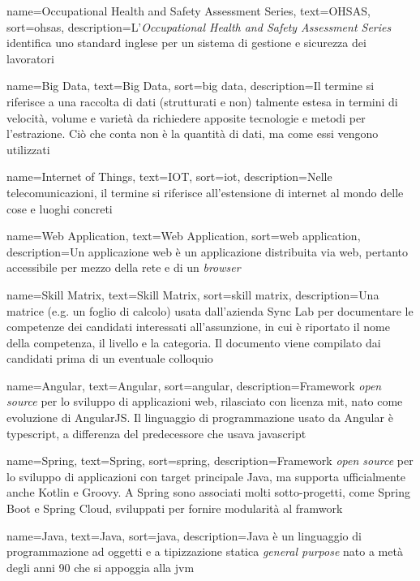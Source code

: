 {
    name=Occupational Health and Safety Assessment Series,
    text=OHSAS,
    sort=ohsas,
    description={L'\emph{Occupational Health and Safety Assessment Series} identifica uno standard inglese per un sistema di gestione e sicurezza dei lavoratori}
}

{
    name=Big Data,
    text=Big Data,
    sort=big data,
    description={Il termine si riferisce a una raccolta di dati (strutturati e non) talmente estesa in termini di velocità, volume e varietà da richiedere apposite tecnologie e metodi per l'estrazione. Ciò che conta non è la quantità di dati, ma come essi vengono utilizzati}
}

{
    name=Internet of Things,
    text=IOT,
    sort=iot,
    description={Nelle telecomunicazioni, il termine si riferisce all'estensione di internet al mondo delle cose e luoghi concreti}
}

{
    name=Web Application,
    text=Web Application,
    sort=web application,
    description={Un applicazione web è un applicazione distribuita via web, pertanto accessibile per mezzo della rete e di un \emph{browser}}
}

{
    name=Skill Matrix,
    text=Skill Matrix,
    sort=skill matrix,
    description={Una matrice (e.g. un foglio di calcolo) usata dall'azienda Sync Lab per documentare le competenze dei candidati interessati all'assunzione, in cui è riportato il nome della competenza, il livello e la categoria. Il documento viene compilato dai candidati prima di un eventuale colloquio}
}

{
    name=Angular,
    text=Angular,
    sort=angular,
    description={Framework \textit{open source} per lo sviluppo di applicazioni web, rilasciato con licenza \gls{mit}, nato come evoluzione di AngularJS. Il linguaggio di programmazione usato da Angular è \gls{typescript}, a differenza del predecessore che usava \gls{javascript}}
}

{
    name=Spring,
    text=Spring,
    sort=spring,
    description={Framework \textit{open source} per lo sviluppo di applicazioni con target principale Java, ma supporta ufficialmente anche Kotlin e Groovy. A Spring sono associati molti sotto-progetti, come Spring Boot e Spring Cloud, sviluppati per fornire modularità al framwork}
}

{
    name=Java,
    text=Java,
    sort=java,
    description={Java è un linguaggio di programmazione ad oggetti e a tipizzazione statica \emph{general purpose} nato a metà degli anni 90 che si appoggia alla \gls{jvm}}
}

